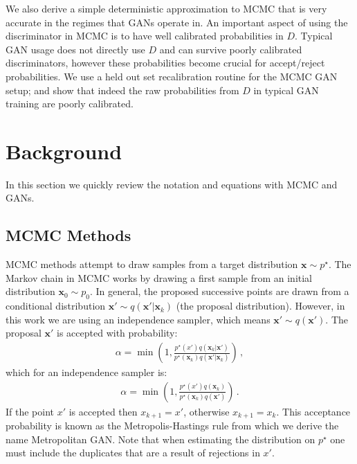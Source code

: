 \documentclass{article}
\renewcommand{\vec}[1]{{\boldsymbol{\mathbf{#1}}}} %
\newcommand{\sample}{\sim}
\newcommand{\given}{|}
\newcommand{\target}{{p^\star}}
\newcommand{\prop}{q}
\newcommand{\pinit}{{p_0}}
\begin{document}
We also derive a simple deterministic approximation to MCMC that is very accurate in the regimes that GANs operate in.
An important aspect of using the discriminator in MCMC is to have well calibrated probabilities in $D$.
Typical GAN usage does not directly use $D$ and can survive poorly calibrated discriminators, however these probabilities become crucial for accept/reject probabilities.
We use a held out set recalibration routine for the MCMC GAN setup; and show that indeed the raw probabilities from $D$ in typical GAN training are poorly calibrated.

\section{Background}

In this section we quickly review the notation and equations with MCMC and GANs.

\subsection{MCMC Methods}

MCMC methods attempt to draw samples from a target distribution $\vec x \sample \target$.
The Markov chain in MCMC works by drawing a first sample from an initial distribution $\vec x_0 \sample \pinit$.
In general, the proposed successive points are drawn from a conditional distribution $\vec x' \sample \prop(\vec x' \given \vec x_k)$ (the proposal distribution)\@.
However, in this work we are using an independence sampler, which means $\vec x' \sample \prop(\vec x')$.
The proposal $\vec x'$ is accepted with probability:
\begin{align}
  \alpha = \min\left(1, \frac{\target(x')\prop(\vec x_k \given \vec x')}{\target(\vec x_k)\prop(\vec x' \given \vec x_k)}\right)\,,
\end{align}
which for an independence sampler is:
\begin{align}
  \alpha = \min\left(1, \frac{\target(x')\prop(\vec x_k)}{\target(\vec x_k)\prop(\vec x')}\right)\,.
\end{align}
If the point $x'$ is accepted then $x_{k+1} = x'$, otherwise $x_{k+1} = x_k$.
This acceptance probability is known as the Metropolis-Hastings rule from which we derive the name Metropolitan GAN\@.
Note that when estimating the distribution on $\target$ one must include the duplicates that are a result of rejections in $x'$.
\end{document}
